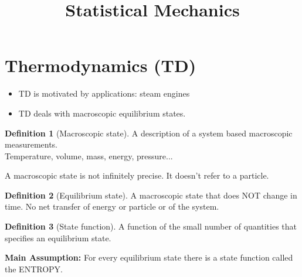 \documentclass[11pt]{article}
\theoremstyle{definition}
\newtheorem{defn}{Definition}[section]
\begin{document}
\setcounter{section}{0}
\title{Statistical Mechanics}
\maketitle

\section{Thermodynamics (TD)}

\begin{itemize}
	\item TD is motivated by applications: steam engines
	\item TD deals with macroscopic equilibrium states.
\end{itemize}

\begin{defn}[Macroscopic state]
	A description of a system based macroscopic measurements. \\
	Temperature, volume, mass, energy, pressure...
\end{defn}
A macroscopic state is not infinitely precise. It doesn't refer to a particle.

\begin{defn}[Equilibrium state]
	A macroscopic state that does NOT change in time. No net transfer of energy or particle or of the system.
\end{defn}

\begin{defn}[State function]
	A function of the small number of quantities that specifies an equilibrium state.
	
\end{defn}

\textbf{Main Assumption:} 
	For every equilibrium state there is a state function called the ENTROPY.
\end{document}

